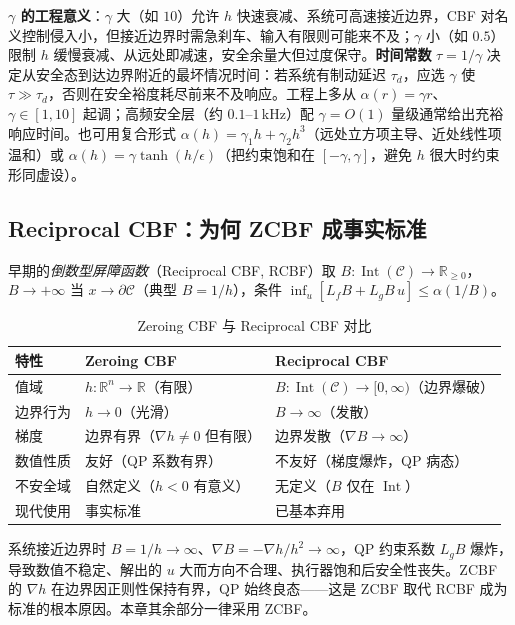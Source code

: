 \textbf{$\gamma$ 的工程意义}：$\gamma$ 大（如 $10$）允许 $h$ 快速衰减、系统可高速接近边界，CBF 对名义控制侵入小，但接近边界时需急刹车、输入有限则可能来不及；$\gamma$ 小（如 $0.5$）限制 $h$ 缓慢衰减、从远处即减速，安全余量大但过度保守。\textbf{时间常数} $\tau=1/\gamma$ 决定从安全态到达边界附近的最坏情况时间：若系统有制动延迟 $\tau_d$，应选 $\gamma$ 使 $\tau\gg\tau_d$，否则在安全裕度耗尽前来不及响应。工程上多从 $\alpha(r)=\gamma r$、$\gamma\in[1,10]$ 起调；高频安全层（约 $0.1$–$1$\,kHz）配 $\gamma=O(1)$ 量级通常给出充裕响应时间。也可用复合形式 $\alpha(h)=\gamma_1 h+\gamma_2 h^3$（远处立方项主导、近处线性项温和）或 $\alpha(h)=\gamma\tanh(h/\epsilon)$（把约束饱和在 $[-\gamma,\gamma]$，避免 $h$ 很大时约束形同虚设）。

\subsection{Reciprocal CBF：为何 ZCBF 成事实标准}

早期的\emph{倒数型屏障函数}（Reciprocal CBF, RCBF）取 $B:\operatorname{Int}(\mathcal C)\to\mathbb R_{\ge0}$，$B\to+\infty$ 当 $x\to\partial\mathcal C$（典型 $B=1/h$），条件 $\inf_u[L_fB+L_gB\,u]\le\alpha(1/B)$。

\begin{table}[H]\centering\small
\caption{Zeroing CBF 与 Reciprocal CBF 对比}
\label{tab:zcbf-vs-rcbf}
\begin{tabular}{lll}
\toprule
特性 & Zeroing CBF & Reciprocal CBF \\
\midrule
值域 & $h:\mathbb R^n\to\mathbb R$（有限） & $B:\operatorname{Int}(\mathcal C)\to[0,\infty)$（边界爆破） \\
边界行为 & $h\to0$（光滑） & $B\to\infty$（发散） \\
梯度 & 边界有界（$\nabla h\neq0$ 但有限） & 边界发散（$\nabla B\to\infty$） \\
数值性质 & 友好（QP 系数有界） & 不友好（梯度爆炸，QP 病态） \\
不安全域 & 自然定义（$h<0$ 有意义） & 无定义（$B$ 仅在 $\operatorname{Int}$） \\
现代使用 & 事实标准 & 已基本弃用 \\
\bottomrule
\end{tabular}
\end{table}

\begin{insight}
系统接近边界时 $B=1/h\to\infty$、$\nabla B=-\nabla h/h^2\to\infty$，QP 约束系数 $L_gB$ 爆炸，导致数值不稳定、解出的 $u$ 大而方向不合理、执行器饱和后安全性丧失。ZCBF 的 $\nabla h$ 在边界因正则性保持有界，QP 始终良态——这是 ZCBF 取代 RCBF 成为标准的根本原因。本章其余部分一律采用 ZCBF。
\end{insight}

